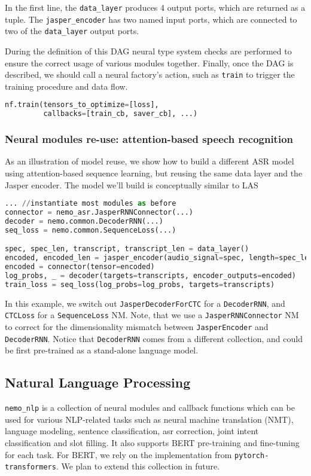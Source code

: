 \documentclass{article}
\begin{document}
In the first line, the \texttt{data\_layer} produces 4 output ports, which are returned as a tuple. The \texttt{jasper\_encoder} has two named input ports, which are connected to two of the \texttt{data\_layer} output ports.

During the definition of this DAG neural type system checks are performed to ensure the correct usage of various modules together. Finally, once the DAG is described, we should call a neural factory's action, such as \texttt{train} to trigger the training procedure and data flow. 
\begin{lstlisting}[language=Python, basicstyle=\small]
nf.train(tensors_to_optimize=[loss],
         callbacks=[train_cb, saver_cb], ...)
\end{lstlisting}

\subsubsection{Neural modules re-use: attention-based speech recognition}\label{laslike}
As an illustration of model reuse, we show how to build a different ASR model using attention-based sequence learning, but reusing the same data layer and the Jasper encoder. The model we'll build is conceptually similar to LAS \citep{chan2016listen}

\begin{lstlisting}[language=Python, basicstyle=\small]
... //instantiate most modules as before
connector = nemo_asr.JasperRNNConnector(...)
decoder = nemo.common.DecoderRNN(...)
seq_loss = nemo.common.SequenceLoss(...)

spec, spec_len, transcript, transcript_len = data_layer()
encoded, encoded_len = jasper_encoder(audio_signal=spec, length=spec_len)
encoded = connector(tensor=encoded)
log_probs, _ = decoder(targets=transcripts, encoder_outputs=encoded)
train_loss = seq_loss(log_probs=log_probs, targets=transcripts)
\end{lstlisting}
In this example, we switch out \texttt{JasperDecoderForCTC} for a \texttt{DecoderRNN}, and \texttt{CTCLoss} for a \texttt{SequenceLoss} NM. Note, that we use a \texttt{JasperRNNConnector} NM to correct for the dimensionality mismatch between \texttt{JasperEncoder} and \texttt{DecoderRNN}. Notice that \texttt{DecoderRNN} comes from a different collection, and could be first pre-trained as a stand-alone language model.



\subsection{Natural Language Processing}
\texttt{nemo\_nlp} is a collection of neural modules and callback functions which can be used for various NLP-related tasks such as neural machine translation (NMT), language modeling, sentence classification, asr correction, joint intent classification and slot filling. It also supports BERT pre-training and fine-tuning for each task. For BERT, we rely on the implementation from \texttt{pytorch-transformers}\cite{ptransformers}. We plan to extend this collection in future.
\end{document}
